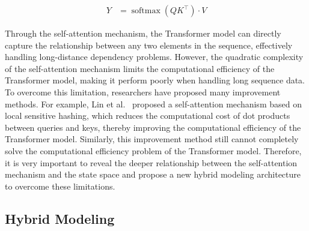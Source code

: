\documentclass{article}
\theoremstyle{plain}
\theoremstyle{definition}
\theoremstyle{remark}
\begin{document}
\begin{equation}
   \begin{aligned}
      Y &= \operatorname*{softmax}({QK^\top}) \cdot V   
   \end{aligned}
\label{eq:self_attention}
\end{equation}


Through the self-attention mechanism, the Transformer model can directly capture the relationship between any two elements in the sequence, effectively handling long-distance dependency problems. However, the quadratic complexity of the self-attention mechanism limits the computational efficiency of the Transformer model, making it perform poorly when handling long sequence data. To overcome this limitation, researchers have proposed many improvement methods. For example, Lin et al.~\cite{kitaev2020reformer} proposed a self-attention mechanism based on local sensitive hashing, which reduces the computational cost of dot products between queries and keys, thereby improving the computational efficiency of the Transformer model. Similarly, this improvement method still cannot completely solve the computational efficiency problem of the Transformer model. Therefore, it is very important to reveal the deeper relationship between the self-attention mechanism and the state space and propose a new hybrid modeling architecture to overcome these limitations.


\subsection{Hybrid Modeling}
\end{document}
